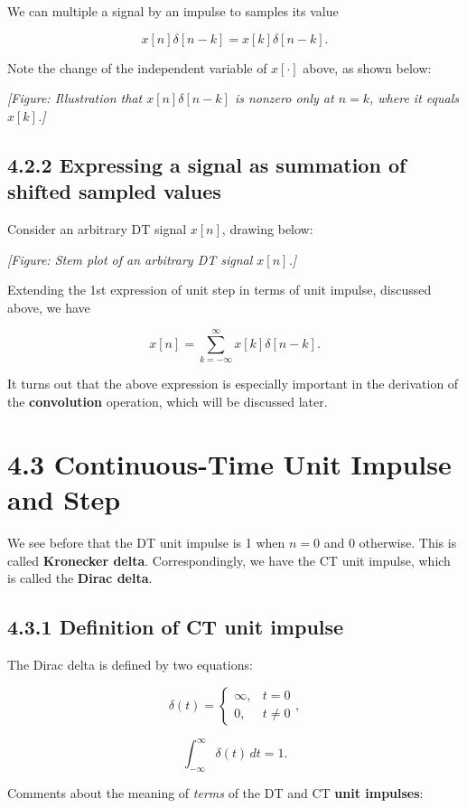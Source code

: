\documentclass[11pt]{article}
\begin{document}
We can multiple a signal by an impulse to samples its value

\[x[n]\delta[n-k] = x[k]\delta[n-k].\]

Note the change of the independent variable of $x[\cdot]$ above, as shown below:

\textit{[Figure: Illustration that $x[n]\delta[n-k]$ is nonzero only at $n = k$, where it equals $x[k]$.]}

\subsection*{4.2.2 Expressing a signal as summation of shifted sampled values}

Consider an arbitrary DT signal $x[n]$, drawing below:

\textit{[Figure: Stem plot of an arbitrary DT signal $x[n]$.]}

Extending the 1st expression of unit step in terms of unit impulse, discussed above, we have

\[x[n] = \sum_{k=-\infty}^{\infty} x[k]\delta[n-k].\]

It turns out that the above expression is especially important in the derivation of the \textbf{convolution} operation, which will be discussed later.

\section*{4.3 Continuous-Time Unit Impulse and Step}

We see before that the DT unit impulse is 1 when $n = 0$ and 0 otherwise. This is called \textbf{Kronecker delta}. Correspondingly, we have the CT unit impulse, which is called the \textbf{Dirac delta}.

\subsection*{4.3.1 Definition of CT unit impulse}

The Dirac delta is defined by two equations:

\[\delta(t) = \begin{cases} \infty, & t = 0 \\ 0, & t \neq 0 \end{cases},\]

\[\int_{-\infty}^{\infty} \delta(t)\, dt = 1.\]

Comments about the meaning of \textit{terms} of the DT and CT \textbf{unit impulses}:
\end{document}
